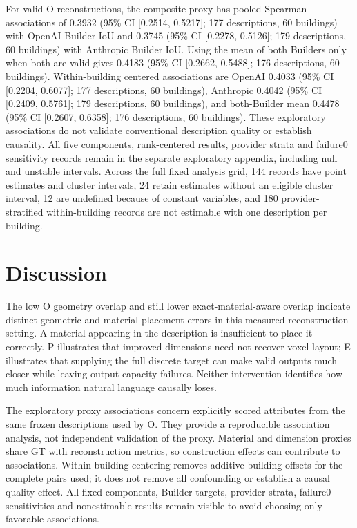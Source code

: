 For valid O reconstructions, the composite proxy has pooled Spearman associations of 0.3932 (95\% CI [0.2514, 0.5217]; 177 descriptions, 60 buildings) with OpenAI Builder IoU and 0.3745 (95\% CI [0.2278, 0.5126]; 179 descriptions, 60 buildings) with Anthropic Builder IoU. Using the mean of both Builders only when both are valid gives 0.4183 (95\% CI [0.2662, 0.5488]; 176 descriptions, 60 buildings). Within-building centered associations are OpenAI 0.4033 (95\% CI [0.2204, 0.6077]; 177 descriptions, 60 buildings), Anthropic 0.4042 (95\% CI [0.2409, 0.5761]; 179 descriptions, 60 buildings), and both-Builder mean 0.4478 (95\% CI [0.2607, 0.6358]; 176 descriptions, 60 buildings). These exploratory associations do not validate conventional description quality or establish causality. All five components, rank-centered results, provider strata and failure0 sensitivity records remain in the separate exploratory appendix, including null and unstable intervals. Across the full fixed analysis grid, 144 records have point estimates and cluster intervals, 24 retain estimates without an eligible cluster interval, 12 are undefined because of constant variables, and 180 provider-stratified within-building records are not estimable with one description per building.

\section{Discussion}

The low O geometry overlap and still lower exact-material-aware overlap indicate distinct geometric and material-placement errors in this measured reconstruction setting. A material appearing in the description is insufficient to place it correctly. P illustrates that improved dimensions need not recover voxel layout; E illustrates that supplying the full discrete target can make valid outputs much closer while leaving output-capacity failures. Neither intervention identifies how much information natural language causally loses.

The exploratory proxy associations concern explicitly scored attributes from the same frozen descriptions used by O. They provide a reproducible association analysis, not independent validation of the proxy. Material and dimension proxies share GT with reconstruction metrics, so construction effects can contribute to associations. Within-building centering removes additive building offsets for the complete pairs used; it does not remove all confounding or establish a causal quality effect. All fixed components, Builder targets, provider strata, failure0 sensitivities and nonestimable results remain visible to avoid choosing only favorable associations.

